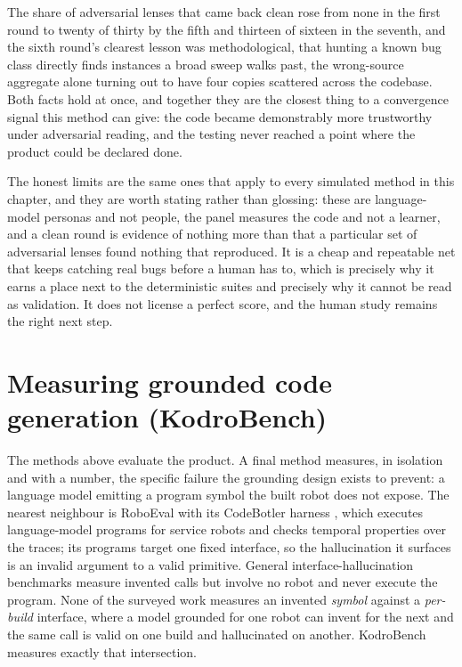 \documentclass[11pt,a4paper]{report}
\begin{document}
The share of adversarial lenses that came back clean rose from none in the first round to twenty of thirty by the fifth and thirteen of sixteen in the seventh, and the sixth round's clearest lesson was methodological, that hunting a known bug class directly finds instances a broad sweep walks past, the wrong-source aggregate alone turning out to have four copies scattered across the codebase. Both facts hold at once, and together they are the closest thing to a convergence signal this method can give: the code became demonstrably more trustworthy under adversarial reading, and the testing never reached a point where the product could be declared done.

The honest limits are the same ones that apply to every simulated method in this chapter, and they are worth stating rather than glossing: these are language-model personas and not people, the panel measures the code and not a learner, and a clean round is evidence of nothing more than that a particular set of adversarial lenses found nothing that reproduced. It is a cheap and repeatable net that keeps catching real bugs before a human has to, which is precisely why it earns a place next to the deterministic suites and precisely why it cannot be read as validation. It does not license a perfect score, and the human study remains the right next step.

\section{Measuring grounded code generation (KodroBench)}
\label{sec:kodrobench}
The methods above evaluate the product. A final method measures, in isolation and with a number, the specific failure the grounding design exists to prevent: a language model emitting a program symbol the built robot does not expose. The nearest neighbour is RoboEval with its CodeBotler harness \citep{hu2023}, which executes language-model programs for service robots and checks temporal properties over the traces; its programs target one fixed interface, so the hallucination it surfaces is an invalid argument to a valid primitive. General interface-hallucination benchmarks measure invented calls but involve no robot and never execute the program. None of the surveyed work measures an invented \emph{symbol} against a \emph{per-build} interface, where a model grounded for one robot can invent for the next and the same call is valid on one build and hallucinated on another. KodroBench measures exactly that intersection.
\end{document}
